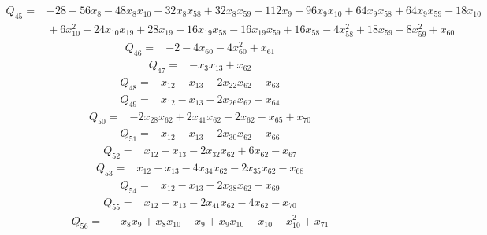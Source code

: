{%
\begin{align*}
 Q_{45}={}&-28 -56x_{8} -48x_{8}x_{10} +32x_{8}x_{58} +32x_{8}x_{59} -112x_{9} -96x_{9}x_{10} +64x_{9}x_{58} +64x_{9}x_{59} -18x_{10}\\
 &{}+6x_{10}^{2} +24x_{10}x_{19} +28x_{19} -16x_{19}x_{58} -16x_{19}x_{59} +16x_{58} -4x_{58}^{2} +18x_{59} -8x_{59}^{2} +x_{60}
\end{align*}
\begin{align*}
 Q_{46}={}&-2 -4x_{60} -4x_{60}^{2} +x_{61}
\end{align*}
\begin{align*}
 Q_{47}={}&-x_{3}x_{13} +x_{62}
\end{align*}
\begin{align*}
 Q_{48}={}&x_{12} -x_{13} -2x_{22}x_{62} -x_{63}
\end{align*}
\begin{align*}
 Q_{49}={}&x_{12} -x_{13} -2x_{26}x_{62} -x_{64}
\end{align*}
\begin{align*}
 Q_{50}={}&-2x_{28}x_{62} +2x_{41}x_{62} -2x_{62} -x_{65} +x_{70}
\end{align*}
\begin{align*}
 Q_{51}={}&x_{12} -x_{13} -2x_{30}x_{62} -x_{66}
\end{align*}
\begin{align*}
 Q_{52}={}&x_{12} -x_{13} -2x_{32}x_{62} +6x_{62} -x_{67}
\end{align*}
\begin{align*}
 Q_{53}={}&x_{12} -x_{13} -4x_{34}x_{62} -2x_{35}x_{62} -x_{68}
\end{align*}
\begin{align*}
 Q_{54}={}&x_{12} -x_{13} -2x_{38}x_{62} -x_{69}
\end{align*}
\begin{align*}
 Q_{55}={}&x_{12} -x_{13} -2x_{41}x_{62} -4x_{62} -x_{70}
\end{align*}
\begin{align*}
 Q_{56}={}&-x_{8}x_{9} +x_{8}x_{10} +x_{9} +x_{9}x_{10} -x_{10} -x_{10}^{2} +x_{71}
\end{align*}
}
